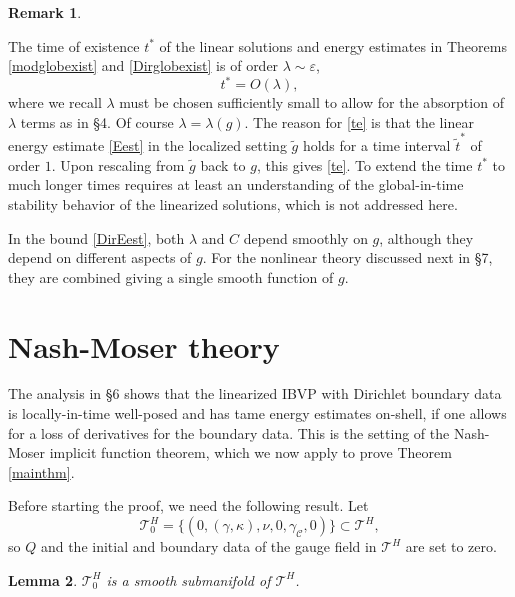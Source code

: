 \documentclass[10pt]{amsart}
\newcommand{\g}{\gamma}
\newcommand{\e}{\varepsilon}
\renewcommand{\k}{\kappa}
\renewcommand{\l}{\lambda}
\newcommand{\cC}{{\mathcal C}}
\newcommand{\cT}{{\mathcal T}}
\newcommand{\be}{\begin{equation}}
\newcommand{\ee}{\end{equation}}
\newcommand{\<}{\langle}
\renewcommand{\>}{\rangle}
\newcommand{\w}{\widetilde}
\theoremstyle{plain}
\newtheorem{lemma}{Lemma}[section]
\theoremstyle{remark}
\theoremstyle{definition}
\newtheorem{remark}[lemma]{Remark}
\numberwithin{equation}{section}
\begin{document}
\begin{remark} \label{toe}
{\rm The time of existence $t^*$ of the linear solutions and energy estimates in Theorems \ref{modglobexist} and \ref{Dirglobexist} is of order $\l \sim \e$, 
\be \label{te}
t^* = O(\l),
\ee
where we recall $\l$ must be chosen sufficiently small to allow for the absorption of $\l$ terms as in \S 4. Of course $\l = \l(g)$.  
The reason for \eqref{te} is that the linear energy estimate \eqref{Eest} in the localized setting $\w g$ holds for a time interval $\w t^*$ of 
order $1$. Upon rescaling from $\w g$ back to $g$, this gives \eqref{te}. To extend the time $t^*$ to much longer times requires at least 
an understanding of the global-in-time stability behavior of the linearized solutions, which is not addressed here. 

  In the bound \eqref{DirEest}, both $\l$ and $C$ depend smoothly on $g$, although they depend on different aspects of $g$. For the nonlinear 
theory discussed next in \S 7, they are combined giving a single smooth function of $g$. 

}
\end{remark}
 
 
\section{Nash-Moser theory}
   
   The analysis in \S 6 shows that the linearized IBVP with Dirichlet boundary data is locally-in-time well-posed and has tame energy estimates on-shell, 
if one allows for a loss of derivatives for the boundary data. This is the setting of the Nash-Moser implicit function theorem, which we now apply to 
prove Theorem \ref{mainthm}. 

  Before starting the proof, we need the following result. Let 
$$\cT^H_0 = \{ (0, (\g, \k), \nu, 0, \g_{\cC}, 0) \} \subset \cT^H,$$
so $Q$ and the initial and boundary data of the gauge field in $\cT^H$ are set to zero. 

\begin{lemma} \label{T0}
$\cT^H_0$ is a smooth submanifold of $\cT^H$. 
\end{lemma} 
\end{document}
